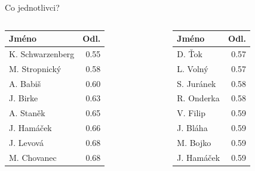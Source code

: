 \documentclass[10pt]{beamer}
\begin{document}
\begin{frame}{Co jednotlivci?}
    \begingroup\small
    \begin{columns}
        \begin{column}{0.33\textwidth}
            \centering\begin{tabular}{lr}
                \hline
                Jméno &        Odl. \\
                \hline
                K. Schwarzenberg &  0.55 \\
                M. Stropnický   &  0.58 \\
                A. Babiš        &  0.60 \\
                J. Birke           &  0.63 \\
                A. Staněk      &  0.65 \\
                J. Hamáček         &  0.66 \\
                J. Levová         &  0.68 \\
                M. Chovanec      &  0.68
            \end{tabular}
        \end{column}
        \begin{column}{0.33\textwidth}
            \centering\begin{tabular}{lr}
                \hline
                Jméno &        Odl. \\
                \hline
            D. Ťok           &  0.57 \\
                L. Volný     &  0.57 \\
                S. Juránek &  0.58 \\
                R. Onderka     &  0.58 \\
                V. Filip     &  0.59 \\
                J. Bláha        &  0.59 \\
                M. Bojko      &  0.59 \\
                J. Hamáček       &  0.59 
            \end{tabular}
        \end{column}
        

\end{columns}
\end{frame}
\end{document}
